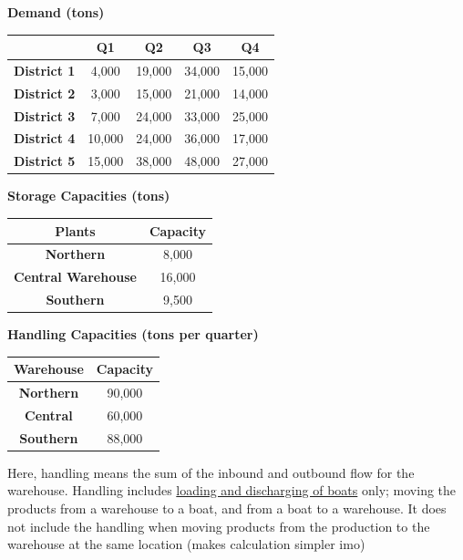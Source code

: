 \documentclass[10pt]{article}
\begin{document}
\textbf{Demand (tons)}
\begin{center}
    \begin{tabular}{|c|c|c|c|c|}
        \hline 
        & \textbf{Q1} & \textbf{Q2} & \textbf{Q3} & \textbf{Q4} \\\hline 
        \textbf{District 1} & 4,000 & 19,000 & 34,000 & 15,000\\\hline
        \textbf{District 2} & 3,000 & 15,000 & 21,000 & 14,000\\\hline
        \textbf{District 3} & 7,000 & 24,000 & 33,000 & 25,000\\\hline
        \textbf{District 4} & 10,000 & 24,000 & 36,000 & 17,000\\\hline
        \textbf{District 5} & 15,000 & 38,000 & 48,000 & 27,000\\\hline
    \end{tabular}
\end{center}

\textbf{Storage Capacities (tons)}
\begin{center}
    \begin{tabular}{|c|c|}
        \hline 
        \textbf{Plants} & \textbf{Capacity}\\\hline 
        \textbf{Northern} & 8,000\\\hline
        \textbf{Central Warehouse} & 16,000\\\hline
        \textbf{Southern} & 9,500\\\hline
    \end{tabular}
\end{center}

\textbf{Handling Capacities (tons per quarter)}
\begin{center}
    \begin{tabular}{|c|c|}
        \hline 
        \textbf{Warehouse} & \textbf{Capacity}\\\hline 
        \textbf{Northern} & 90,000\\\hline
        \textbf{Central} & 60,000\\\hline
        \textbf{Southern} & 88,000\\\hline
    \end{tabular}
\end{center}
Here, handling means the sum of the inbound and outbound flow for the warehouse. Handling includes \underline{loading and discharging of boats} only; moving the products from a warehouse to a boat, and from a boat to a warehouse. It does not include the handling when moving products from the production to the warehouse at the same location (makes calculation simpler imo)
\end{document}
